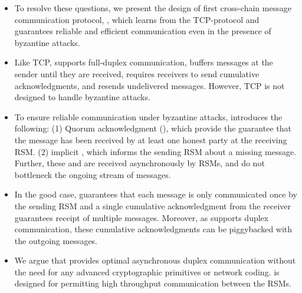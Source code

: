 \begin{itemize}
\item To resolve these questions, we present the design of first cross-chain message communication 
protocol, \Shadow{}, which learns from the TCP-protocol and guarantees reliable and efficient 
communication even in the presence of byzantine attacks.

\item Like TCP, \Shadow{} supports full-duplex communication, 
buffers messages at the sender until they are received, 
requires receivers to send cumulative acknowledgments, and 
resends undelivered messages.
However, TCP is not designed to handle byzantine attacks. 

\item To ensure reliable communication under byzantine attacks, \Shadow{} introduces the following:
(1) Quorum acknowledgment (\quack{}), which provide the guarantee that the message has been received by 
at least one honest party at the receiving RSM.
(2) implicit \duck{}, which informs the sending RSM about a missing message. 
Further, these  and  are received asynchronously by RSMs, and 
do not bottleneck the ongoing stream of messages.
 
\item In the good case, \Shadow{} guarantees that each message is only communicated once by the 
sending RSM and a single cumulative acknowledgment from the receiver guarantees receipt of 
multiple messages.
Moreover, as \Shadow{} supports duplex communication, these cumulative acknowledgments can be piggybacked  
with the outgoing messages.

\item We argue that \Shadow{} provides optimal asynchronous duplex communication without the 
need for any advanced cryptographic primitives or network coding.
\Shadow{} is designed for permitting high throughput communication between the RSMs.

\end{itemize}
